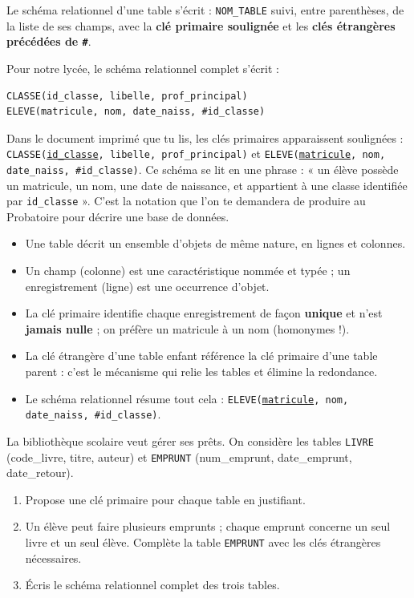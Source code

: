 \documentclass[11pt]{article}
\newcommand{\cle}[1]{{\popxbold\color{popdark}#1}}
\begin{document}
\begin{definition}
Le \cle{schéma relationnel} d'une table s'écrit : \texttt{NOM\_TABLE} suivi, entre parenthèses, de la liste de ses champs, avec la \textbf{clé primaire soulignée} et les \textbf{clés étrangères précédées de \texttt{\#}}.
\end{definition}

Pour notre lycée, le schéma relationnel complet s'écrit :

\begin{lstlisting}
CLASSE(id_classe, libelle, prof_principal)
ELEVE(matricule, nom, date_naiss, #id_classe)
\end{lstlisting}

Dans le document imprimé que tu lis, les clés primaires apparaissent soulignées : \texttt{CLASSE(\underline{id\_classe}, libelle, prof\_principal)} et \texttt{ELEVE(\underline{matricule}, nom, date\_naiss, \#id\_classe)}. Ce schéma se lit en une phrase : « un élève possède un matricule, un nom, une date de naissance, et appartient à une classe identifiée par \texttt{id\_classe} ». C'est la notation que l'on te demandera de produire au Probatoire pour décrire une base de données.

\begin{aretenir}
\begin{itemize}
\item Une \cle{table} décrit un ensemble d'objets de même nature, en lignes et colonnes.
\item Un \cle{champ} (colonne) est une caractéristique nommée et typée ; un \cle{enregistrement} (ligne) est une occurrence d'objet.
\item La \cle{clé primaire} identifie chaque enregistrement de façon \textbf{unique} et n'est \textbf{jamais nulle} ; on préfère un matricule à un nom (homonymes !).
\item La \cle{clé étrangère} d'une table enfant référence la clé primaire d'une table parent : c'est le mécanisme qui relie les tables et élimine la redondance.
\item Le \cle{schéma relationnel} résume tout cela : \texttt{ELEVE(\underline{matricule}, nom, date\_naiss, \#id\_classe)}.
\end{itemize}
\end{aretenir}

\begin{exercice}
La bibliothèque scolaire veut gérer ses prêts. On considère les tables \texttt{LIVRE} (code\_livre, titre, auteur) et \texttt{EMPRUNT} (num\_emprunt, date\_emprunt, date\_retour).
\begin{enumerate}
\item Propose une clé primaire pour chaque table en justifiant.
\item Un élève peut faire plusieurs emprunts ; chaque emprunt concerne un seul livre et un seul élève. Complète la table \texttt{EMPRUNT} avec les clés étrangères nécessaires.
\item Écris le schéma relationnel complet des trois tables.
\end{enumerate}
\end{exercice}
\end{document}
